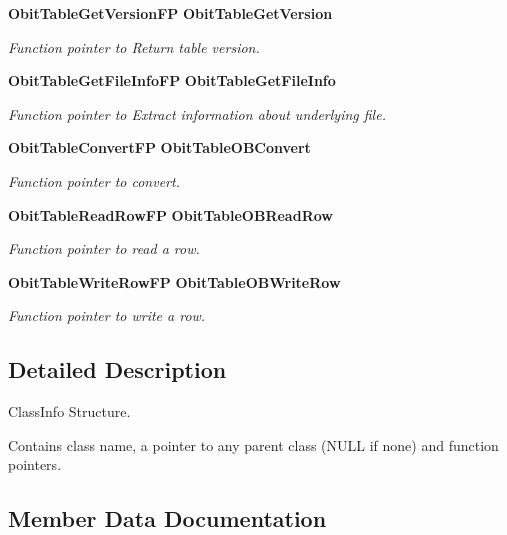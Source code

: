 \begin{CompactItemize}
{\bf Obit\-Table\-Get\-Version\-FP} {\bf Obit\-Table\-Get\-Version}
\begin{CompactList}\small\item\em Function pointer to Return table version. \item\end{CompactList}\item 
{\bf Obit\-Table\-Get\-File\-Info\-FP} {\bf Obit\-Table\-Get\-File\-Info}
\begin{CompactList}\small\item\em Function pointer to Extract information about underlying file. \item\end{CompactList}\item 
{\bf Obit\-Table\-Convert\-FP} {\bf Obit\-Table\-OBConvert}
\begin{CompactList}\small\item\em Function pointer to convert. \item\end{CompactList}\item 
{\bf Obit\-Table\-Read\-Row\-FP} {\bf Obit\-Table\-OBRead\-Row}
\begin{CompactList}\small\item\em Function pointer to read a row. \item\end{CompactList}\item 
{\bf Obit\-Table\-Write\-Row\-FP} {\bf Obit\-Table\-OBWrite\-Row}
\begin{CompactList}\small\item\em Function pointer to write a row. \item\end{CompactList}\end{CompactItemize}


\subsection{Detailed Description}
Class\-Info Structure. 

Contains class name, a pointer to any parent class (NULL if none) and function pointers. 



\subsection{Member Data Documentation}
